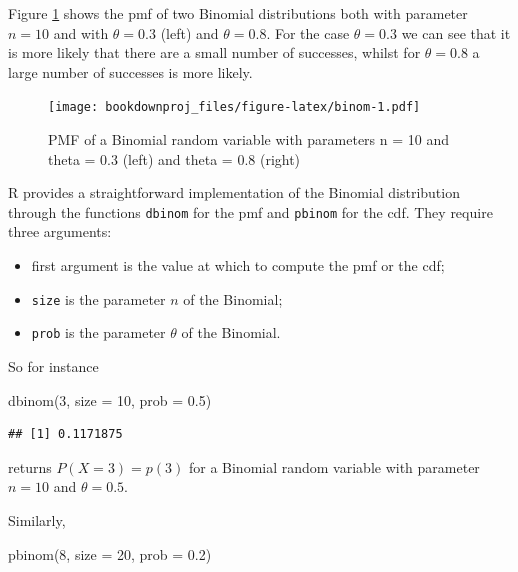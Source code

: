 \documentclass[
]{book}
\newenvironment{Shaded}{\begin{snugshade}}{\end{snugshade}}
\newcommand{\AttributeTok}[1]{\textcolor[rgb]{0.77,0.63,0.00}{#1}}
\newcommand{\DecValTok}[1]{\textcolor[rgb]{0.00,0.00,0.81}{#1}}
\newcommand{\FloatTok}[1]{\textcolor[rgb]{0.00,0.00,0.81}{#1}}
\newcommand{\FunctionTok}[1]{\textcolor[rgb]{0.00,0.00,0.00}{#1}}
\newcommand{\NormalTok}[1]{#1}
\begin{document}
Figure \ref{fig:binom} shows the pmf of two Binomial distributions both with parameter \(n=10\) and with \(\theta=0.3\) (left) and \(\theta=0.8\). For the case \(\theta=0.3\) we can see that it is more likely that there are a small number of successes, whilst for \(\theta=0.8\) a large number of successes is more likely.

\begin{figure}
\centering
\texttt{[image: bookdownproj\_files/figure-latex/binom-1.pdf]}
\caption{\label{fig:binom}PMF of a Binomial random variable with parameters n = 10 and theta = 0.3 (left) and theta = 0.8 (right)}
\end{figure}

R provides a straightforward implementation of the Binomial distribution through the functions \texttt{dbinom} for the pmf and \texttt{pbinom} for the cdf. They require three arguments:

\begin{itemize}
\item
  first argument is the value at which to compute the pmf or the cdf;
\item
  \texttt{size} is the parameter \(n\) of the Binomial;
\item
  \texttt{prob} is the parameter \(\theta\) of the Binomial.
\end{itemize}

So for instance

\begin{Shaded}
\begin{Highlighting}[]
\FunctionTok{dbinom}\NormalTok{(}\DecValTok{3}\NormalTok{, }\AttributeTok{size =} \DecValTok{10}\NormalTok{, }\AttributeTok{prob =} \FloatTok{0.5}\NormalTok{)}
\end{Highlighting}
\end{Shaded}

\begin{verbatim}
## [1] 0.1171875
\end{verbatim}

returns \(P(X=3)=p(3)\) for a Binomial random variable with parameter \(n=10\) and \(\theta = 0.5\).

Similarly,

\begin{Shaded}
\begin{Highlighting}[]
\FunctionTok{pbinom}\NormalTok{(}\DecValTok{8}\NormalTok{, }\AttributeTok{size =} \DecValTok{20}\NormalTok{, }\AttributeTok{prob =} \FloatTok{0.2}\NormalTok{)}
\end{Highlighting}
\end{Shaded}
\end{document}
